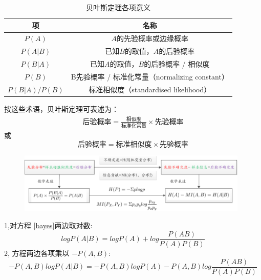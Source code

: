\documentclass{beamer}
\begin{document}
\begin{CJK}{UTF8}{gkai}
\begin{frame}
\begin{table}[H] 
\centering
\caption{贝叶斯定理各项意义}
\begin{tabular}{cc}
\toprule[1.5 pt]
  项 &  名称\\
\midrule[1pt] 
$P(A)$& $A$的先验概率或边缘概率\\
$P(A|B)$& 已知$B$的取值，$A$的后验概率\\
$P(B|A)$& 已知$A$的取值，$B$的后验概率 / 相似度\\
$P(B)$& B先验概率 / 标准化常量（normalizing 
constant）\\
$P(B | A)/ P(B)$& 标准相似度（standardised 
likelihood）\\
\bottomrule[1.5 pt] 
\end{tabular}
\end{table}
按这些术语，贝叶斯定理可表述为：
\begin{eqnarray}
\text{后验概率}=\frac{\text{相似度}}{\text{标准化常量}}\times \text{先验概率}
\end{eqnarray}
或
 \begin{equation}
\text{后验概率}=\text{标准相似度}\times \text{先验概率}
\end{equation}
\end{frame}
  
\begin{frame}
\begin{figure}
\centering
\includegraphics[width=11cm]{theory.png}
\end{figure}
\end{frame}

\begin{frame}
1,对方程 \ref{bayes}两边取对数:
\begin{equation}
\label{log}
logP(A|B) =logP(A)+log \frac{P (AB)}{P(A)P(B)} 
\end{equation}
2, 方程两边各项乘以 $-P(A,B)$:
\begin{equation}
\label{element}
-P(A,B)logP(A|B) =-P(A,B) logP(A)-P(A,B) log \frac{P (AB)}
{P(A)P(B)} 
\end{equation} 

\end{frame} 


\end{CJK}
\end{document}
